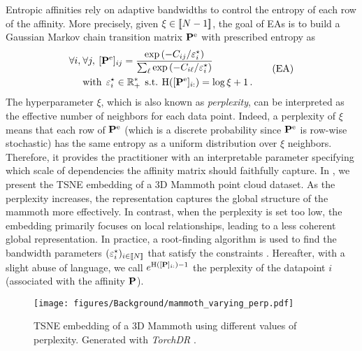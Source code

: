 Entropic affinities rely on adaptive bandwidths to control the entropy of each row of the affinity. More precisely, given $\xi \in {[\![N-1]\!]}$, the goal of EAs is to build a Gaussian Markov chain transition matrix ${\mathbf{P}}^{\mathrm{e}}$ with prescribed entropy as
\begin{equation}
\begin{split}
    \forall i, \: &\forall j, \: [{\mathbf{P}}^{\mathrm{e}}]_{ij} = \frac{\exp{(-C_{ij}/\varepsilon^\star_i)}}{\sum_\ell \exp{(-C_{i\ell}/\varepsilon^\star_i)}} \\
    &\text{with} \:\: \varepsilon^\star_i \in \mathbb{R}^*_+ \:\: \text{s.t.} \: \operatorname{H}([{\mathbf{P}}^{\mathrm{e}}]_{i:}) = \log{\xi} + 1\,. \label{eq:entropic_affinity_pb}
\end{split}\tag{EA}
\end{equation}
The hyperparameter $\xi$, which is also known as \emph{perplexity}, can be interpreted as the effective number of neighbors for each data point. Indeed, a perplexity of $\xi$ means that each row of ${\mathbf{P}}^{\mathrm{e}}$ (which is a discrete probability since ${\mathbf{P}}^{\mathrm{e}}$ is row-wise stochastic) has the same entropy as a uniform distribution over $\xi$ neighbors. Therefore, it provides the practitioner with an interpretable parameter specifying which scale of dependencies the affinity matrix should faithfully capture. In , we present the TSNE embedding of a 3D Mammoth point cloud dataset. As the perplexity increases, the representation captures the global structure of the mammoth more effectively. In contrast, when the perplexity is set too low, the embedding primarily focuses on local relationships, leading to a less coherent global representation. In practice, a root-finding algorithm is used to find the bandwidth parameters $(\varepsilon_i^\star)_{i \in {[\![N]\!]}}$ that satisfy the constraints \citep{vladymyrov2013entropic}. Hereafter, with a slight abuse of language, we call $e^{\operatorname{H}([{\mathbf{P}}]_{i:})-1}$ the perplexity of the datapoint $i$ (associated with the affinity ${\mathbf{P}}$).

\begin{figure}[t]
    \centering
    \texttt{[image: figures/Background/mammoth\_varying\_perp.pdf]}
    \caption{TSNE embedding of a 3D Mammoth using different values of perplexity. Generated with \emph{TorchDR} \citep{vanassel2024torchdr}.}
    \label{fig:varying_perp}
\end{figure}


